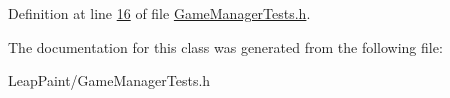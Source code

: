Definition at line \hyperlink{_game_manager_tests_8h_source_l00016}{16} of file \hyperlink{_game_manager_tests_8h_source}{Game\-Manager\-Tests.\-h}.



The documentation for this class was generated from the following file\-:\begin{DoxyCompactItemize}
\item 
Leap\-Paint/Game\-Manager\-Tests.\-h\end{DoxyCompactItemize}
